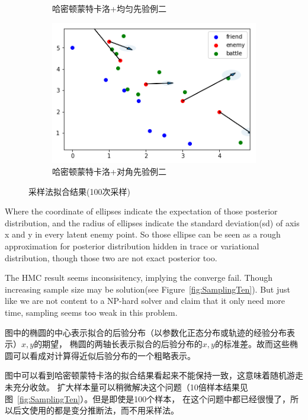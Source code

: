 \documentclass{article}
\begin{document}
\begin{figure}[ht]
\begin{subfigure}[b]{0.45\linewidth}
    \caption{哈密顿蒙特卡洛+均匀先验例二}
  \end{subfigure}
  \begin{subfigure}[b]{0.45\linewidth}
    \includegraphics[width=\linewidth]{Sampling22.png}
    \caption{哈密顿蒙特卡洛+对角先验例二}
  \end{subfigure}
  \caption{采样法拟合结果(100次采样)}
  \label{fig:samping}
\end{figure}

Where the coordinate of ellipses indicate the expectation of those posterior distribution,
and the radius of ellipses indicate the standard deviation(sd) of axis x and y in every latent enemy point.
So those ellipse can be seen as a rough approximation for posterior distribution 
hidden in trace or variational distribution, though those two are not exact posterior too.

The HMC result seems inconsisitency, implying the converge fail. Though increasing sample size may be
solution(see Figure~\ref{fig:SamplingTen}). But just like we are not content to a NP-hard solver and claim that it only need more time,
sampling seems too weak in this problem.

图中的椭圆的中心表示拟合的后验分布（以参数化正态分布或轨迹的经验分布表示）$x,y$的期望，
椭圆的两轴长表示拟合的后验分布的$x,y$的标准差。故而这些椭圆可以看成对计算得近似后验分布的一个粗略表示。

图中可以看到哈密顿蒙特卡洛的拟合结果看起来不能保持一致，这意味着随机游走未充分收敛。
扩大样本量可以稍微解决这个问题（10倍样本结果见图~\ref{fig:SamplingTen}）。但是即使是100个样本，
在这个问题中都已经很慢了，所以后文使用的都是变分推断法，而不用采样法。
\end{document}
